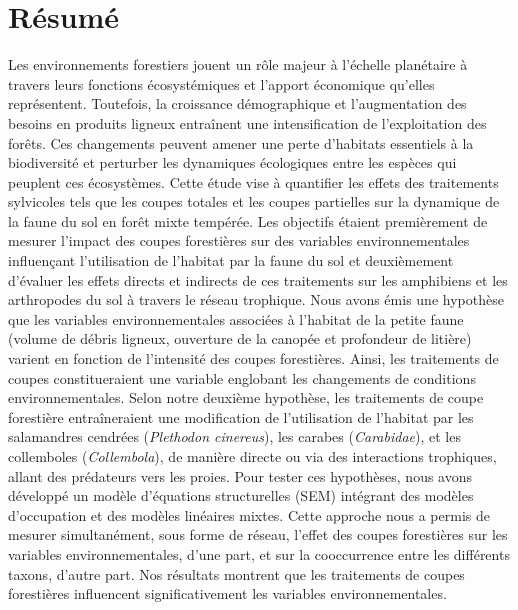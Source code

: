 \chapter*{Résumé}               %
\label{chap-resume}             %

Les environnements forestiers jouent un rôle majeur à l’échelle planétaire à travers leurs fonctions écosystémiques et l'apport économique qu’elles représentent. 
Toutefois, la croissance démographique et l’augmentation des besoins en produits ligneux entraînent une intensification de l'exploitation des forêts. 
Ces changements peuvent amener  une perte d'habitats essentiels à la biodiversité et perturber les dynamiques écologiques entre les espèces qui peuplent ces écosystèmes. 
Cette étude vise à quantifier les effets des traitements sylvicoles tels que les coupes totales et les coupes partielles sur la dynamique de la faune du sol en forêt mixte tempérée. 
Les objectifs étaient premièrement de mesurer l’impact des coupes forestières sur des variables environnementales influençant l’utilisation de l’habitat par la faune du sol 
et deuxièmement d’évaluer les effets directs et indirects de ces traitements sur les amphibiens et les arthropodes du sol à travers le réseau trophique. 
Nous avons émis une hypothèse que les variables environnementales associées à l’habitat de la petite faune (volume de débris ligneux, ouverture de la canopée et profondeur de litière) varient en fonction de l’intensité des coupes forestières. 
Ainsi, les traitements de coupes constitueraient une variable englobant les changements de conditions environnementales. 
Selon notre deuxième hypothèse, les traitements de coupe forestière entraîneraient une modification de l'utilisation de l'habitat 
par les salamandres cendrées (\textit{Plethodon cinereus}), les carabes (\textit{Carabidae}), et les collemboles (\textit{Collembola}), de manière directe ou via des interactions trophiques, 
allant des prédateurs vers les proies. 
Pour tester ces hypothèses, nous avons développé un modèle d’équations structurelles (SEM) intégrant des modèles d’occupation et des modèles linéaires mixtes. 
Cette approche nous a permis de mesurer simultanément, sous forme de réseau, l’effet des coupes forestières sur les variables environnementales, d’une part, et sur la cooccurrence entre les différents taxons, d’autre part. 
Nos résultats montrent que les traitements de coupes forestières influencent significativement les variables environnementales. 
